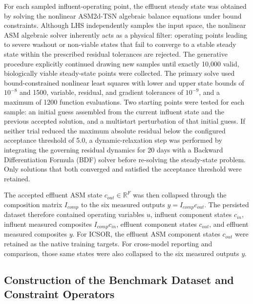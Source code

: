 \documentclass[11pt]{article}
\begin{document}
For each sampled influent-operating point, the effluent steady state was obtained by solving the nonlinear ASM2d-TSN algebraic balance equations under bound constraints. Although LHS independently samples the input space, the nonlinear ASM algebraic solver inherently acts as a physical filter: operating points leading to severe washout or non-viable states that fail to converge to a stable steady state within the prescribed residual tolerances are rejected. The generative procedure explicitly continued drawing new samples until exactly 10,000 valid, biologically viable steady-state points were collected. The primary solve used bound-constrained nonlinear least squares with lower and upper state bounds of $10^{-8}$ and 1500, variable, residual, and gradient tolerances of $10^{-9}$, and a maximum of 1200 function evaluations. Two starting points were tested for each sample: an initial guess assembled from the current influent state and the previous accepted solution, and a multistart perturbation of that initial guess. If neither trial reduced the maximum absolute residual below the configured acceptance threshold of 5.0, a dynamic-relaxation step was performed by integrating the governing residual dynamics for 20 days with a Backward Differentiation Formula (BDF) solver before re-solving the steady-state problem. Only solutions that both converged and satisfied the acceptance threshold were retained.

The accepted effluent ASM state $c_{out} \in \mathbb{R}^F$ was then collapsed through the composition matrix $I_{comp}$ to the six measured outputs $y = I_{comp} c_{out}$. The persisted dataset therefore contained operating variables $u$, influent component states $c_{in}$, influent measured composites $I_{comp} c_{in}$, effluent component states $c_{out}$, and effluent measured composites $y$. For ICSOR, the effluent ASM component states $c_{out}$ were retained as the native training targets. For cross-model reporting and comparison, those same states were also collapsed to the six measured outputs $y$.

\subsection{Construction of the Benchmark Dataset and Constraint Operators}
\end{document}
